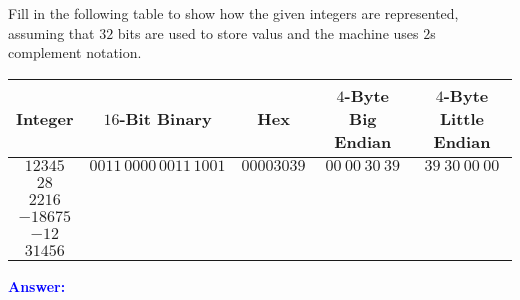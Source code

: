\item{}
Fill in the following table to show how the given integers are represented,
assuming that $32$ bits are used to store valus and the machine uses $2$s
complement notation.\\[6pt]
\begin{tabular}{|c|c|c|c|c|}
    \hline
    {\bf Integer} & {\bf $16$-Bit Binary} & {\bf Hex} & {\bf $4$-Byte Big Endian}
        & {\bf $4$-Byte Little Endian} \\ \hline\hline
    $12345$ & $0011\,0000\,0011\,1001$ & $00003039$
        & $00\ 00\ 30\ 39$ & $39\ 30\ 00\ 00$ \\ \hline
    $28$ & & & & \\ \hline
    $2216$ & & & & \\ \hline
    $-18675$ & & & & \\ \hline
    $-12$ & & & & \\ \hline
    $31456$ & & & & \\ \hline
\end{tabular}
\vskip12pt
\ifanswers
\textcolor{blue}{
\textbf{Answer:}\\
}
\newpage
\fi
